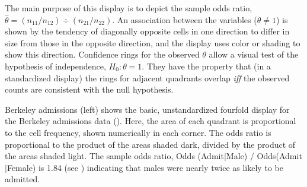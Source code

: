 \documentclass[11pt]{book}
\renewenvironment{knitrout}{\small\renewcommand{\baselinestretch}{.85}}{} %
\begin{document}
The main purpose of this display is to depict the sample odds ratio,
\(\hat{\theta} = (n_{11} /  n_{12} )
\div  (n_{21} /  n_{22} )\).  
An association between the variables
(\(\theta \neq 1\)) is shown by the tendency of diagonally opposite
cells in one direction to differ in size from those in the opposite
direction, and the display uses color or shading to show this
direction.  Confidence rings for the observed \(\theta\) allow a
visual test of the hypothesis of independence,
 \(H_0 :  \theta  =  1\).  They have
the property that (in a standardized display) the rings for adjacent quadrants overlap \emph{iff}
the observed counts are consistent with the null hypothesis.

\begin{Example}[berkeley2]{Berkeley admissions}
(left) shows the basic, unstandardized 
fourfold display for the
Berkeley admissions data ().
Here, the area of each quadrant is proportional to the cell frequency,
shown numerically in each corner.
The odds ratio is proportional to the product of the areas
shaded dark, divided by the product of the areas shaded light.
The sample odds ratio, Odds (Admit\(|\)Male) / Odds(Admit\(|\)Female) is
1.84 (see )
indicating that males were nearly twice as likely to be admitted.

\begin{knitrout}
\color{fgcolor}\begin{kframe}
\begin{alltt}
 \hlstd{=}\hlstd{)}   
 \hlstd{=}\hlstd{)}        
\end{alltt}
\end{kframe}\begin{figure}[!htbp]



\end{figure}
\end{knitrout}
\end{Example}
\end{document}
